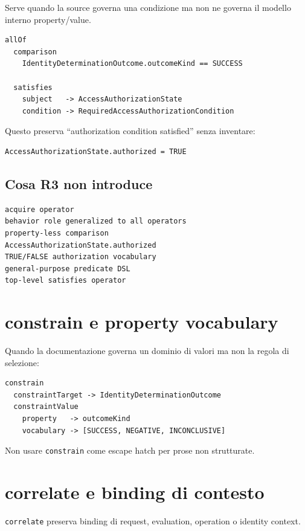 \documentclass[11pt,a4paper]{article}
\newcommand{\code}[1]{\nolinkurl{#1}}
\begin{document}
Serve quando la source governa una condizione ma non ne governa il modello interno property/value.

\begin{examplebox}[FR-1.1]
\begin{lstlisting}
allOf
  comparison
    IdentityDeterminationOutcome.outcomeKind == SUCCESS

  satisfies
    subject   -> AccessAuthorizationState
    condition -> RequiredAccessAuthorizationCondition
\end{lstlisting}

Questo preserva ``authorization condition satisfied'' senza inventare:
\begin{lstlisting}
AccessAuthorizationState.authorized = TRUE
\end{lstlisting}
\end{examplebox}

\subsection{Cosa R3 non introduce}

\begin{lstlisting}
acquire operator
behavior role generalized to all operators
property-less comparison
AccessAuthorizationState.authorized
TRUE/FALSE authorization vocabulary
general-purpose predicate DSL
top-level satisfies operator
\end{lstlisting}

\section{constrain e property vocabulary}

Quando la documentazione governa un dominio di valori ma non la regola di selezione:

\begin{lstlisting}
constrain
  constraintTarget -> IdentityDeterminationOutcome
  constraintValue
    property   -> outcomeKind
    vocabulary -> [SUCCESS, NEGATIVE, INCONCLUSIVE]
\end{lstlisting}

Non usare \code{constrain} come escape hatch per prose non strutturate.

\section{correlate e binding di contesto}

\code{correlate} preserva binding di request, evaluation, operation o identity context.
\end{document}
